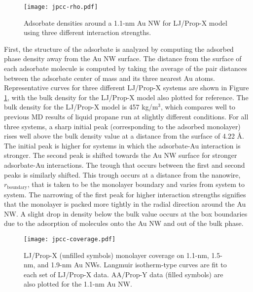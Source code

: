 \documentclass[10pt]{report}  %
\newcommand\findent{\hspace*{\parindent}}
\begin{document}
%
%
\begin{figure}[b!]
	\centering
	\texttt{[image: jpcc-rho.pdf]}
	\caption{ Adsorbate densities around a 1.1-nm Au NW for LJ/Prop-X model using three different interaction strengths. }
	\label{fig:jpcc-rho}
\end{figure}

\findent First, the structure of the adsorbate is analyzed by computing the adsorbed phase density away from the Au NW surface.  The distance from the surface of each adsorbate molecule is computed by taking the average of the pair distances between the adsorbate center of mass and its three nearest Au atoms.  Representative curves for three different LJ/Prop-X systems are shown in Figure \ref{fig:jpcc-rho}, with the bulk density for the LJ/Prop-X model also plotted for reference.  The bulk density for the LJ/Prop-X model is 457 kg/m$^3$, which compares well to previous MD results of liquid propane run at slightly different conditions.\cite{Krishna:2005}  For all three systems, a sharp initial peak (corresponding to the adsorbed monolayer) rises well above the bulk density value at a distance from the surface of 4.22 \AA.  The initial peak is higher for systems in which the adsorbate-Au interaction is stronger.  The second peak is shifted towards the Au NW surface for stronger adsorbate-Au interactions.  The trough that occurs between the first and second peaks is similarly shifted.  This trough occurs at a distance from the nanowire, $r_\mathrm{boundary}$, that is taken to be the monolayer boundary and varies from system to system.  The narrowing of the first peak for higher interaction strengths signifies that the monolayer is packed more tightly in the radial direction around the Au NW.  A slight drop in density below the bulk value occurs at the box boundaries due to the adsorption of molecules onto the Au NW and out of the bulk phase.

%
%
\begin{figure}[b!]
	\centering
	\texttt{[image: jpcc-coverage.pdf]}
	\caption{LJ/Prop-X (unfilled symbols) monolayer coverage on 1.1-nm, 1.5-nm, and 1.9-nm Au NWs.  Langmuir isotherm-type curves are fit to each set of LJ/Prop-X data.  AA/Prop-Y data (filled symbols) are also plotted for the 1.1-nm Au NW.}
	\label{fig:jpcc-coverage}
\end{figure}
\end{document}
